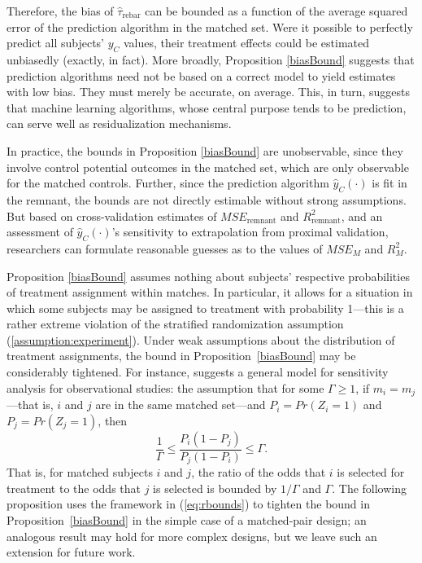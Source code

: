 \documentclass[12pt]{article}\usepackage[]{graphicx}\usepackage[]{color}
\newcommand{\est}{\hat{\tau}_{\text{rebar}}}
\newcommand{\Match}{M}
\newcommand{\match}{m}
\newcommand{\algorithm}{\hat{y}_C(\cdot)}
\begin{document}
Therefore, the bias of $\est$ can be bounded as a function of the
average squared error of the prediction algorithm in the matched set.
Were it possible to perfectly predict all subjects'
$y_C$
values, their treatment effects could be estimated unbiasedly
(exactly, in fact).
More broadly, Proposition \ref{biasBound} suggests that prediction
algorithms need not be based on a correct model to yield
estimates with low bias.
They must merely be accurate, on average.
This, in turn, suggests that machine learning algorithms, whose
central purpose tends to be prediction, can serve well as
residualization mechanisms.

In practice, the bounds in Proposition \ref{biasBound} are unobservable, since they involve control potential outcomes in the matched set, which are only observable for the matched controls.
Further, since the prediction algorithm $\algorithm$ is fit in the remnant, the bounds are not directly estimable without strong assumptions.
But based on cross-validation estimates of $MSE_{\text{remnant}}$ and $R^2_{\text{remnant}}$, and an assessment of $\algorithm$'s sensitivity to extrapolation from proximal validation, researchers can formulate reasonable guesses as to the values of $MSE_{\Match}$ and $R^2_{\Match}$.

Proposition \ref{biasBound} assumes nothing about subjects' respective
probabilities of treatment assignment within matches.
In particular, it allows for a situation in which some subjects may
be assigned to treatment with probability 1---this is a rather extreme
violation of the stratified randomization assumption (\ref{assumption:experiment}).
Under weak assumptions about the distribution of treatment
assignments, the bound in Proposition~\ref{biasBound} may be
considerably tightened.
For instance, \citet{rosenbaum:2002} suggests a general model for sensitivity
analysis for observational studies: the assumption that for some $\Gamma\ge
1$, if
$\match_i=\match_j$---that is, $i$ and $j$ are in the same matched
set---and $P_i=Pr(Z_i=1)$ and $P_j=Pr(Z_j=1)$, then
\begin{equation}\label{eq:rbounds}
  \frac{1}{\Gamma}\le\frac{P_i(1-P_j)}{P_j(1-P_i)}\le \Gamma.
\end{equation}
That is, for matched subjects $i$ and $j$, the ratio of the odds that
$i$ is selected for treatment to the odds that $j$ is selected is
bounded by $1/\Gamma$ and $\Gamma$.
The following proposition uses the framework in (\ref{eq:rbounds}) to
tighten the bound in Proposition~\ref{biasBound} in the simple case of a
matched-pair design; an analogous result may hold for more
complex designs, but we leave such an extension for future work.
\end{document}
